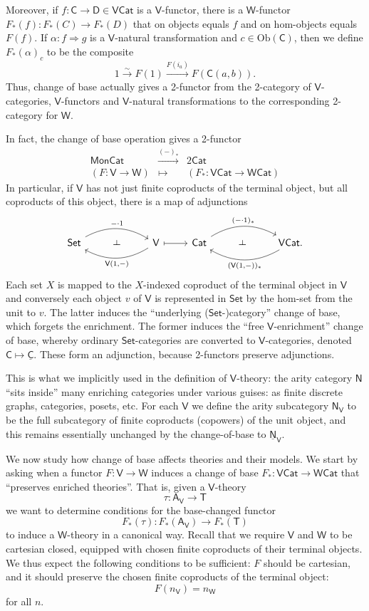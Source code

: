 \documentclass{amsart}
\theoremstyle{definition}
\def\ld{\rotatebox[origin=c]{-90}{$\dashv$}} %
\newcommand{\Set}{\mathsf{Set}}
\newcommand{\Cat}{\mathsf{Cat}}
\newcommand{\Mon}{\mathsf{Mon}}
\newcommand{\NN}{\mathsf{N}}
\newcommand{\A}{\mathsf{A}}
\newcommand{\V}{\mathsf{V}}
\newcommand{\W}{\mathsf{W}}
\newcommand{\D}{\mathsf{D}}
\newcommand{\C}{\mathsf{C}}
\newcommand{\T}{\mathsf{T}}
\newcommand{\Obj}{\mathrm{Ob}}
\newcommand{\maps}{\colon}
\begin{document}
Moreover, if $f\maps \C \to \D \in \V\Cat$ is a $\V$-functor, there is a $\W$-functor $F_*(f) \maps F_*(C) \to F_*(D)$ that on objects equals $f$ and on hom-objects equals $F(f)$. If $\alpha\maps f \Rightarrow g$ is a $\V$-natural transformation and $c\in \Obj(\C)$, then we define $F_*(\alpha)_c$ to be the composite
\[      1 \stackrel{\sim}{\longrightarrow} F(1) \stackrel{F(i_a)}{\longrightarrow}
F(\C(a,b)) .\]   
Thus, change of base actually gives a 2-functor from the 2-category of $\V$-categories, 
$\V$-functors and $\V$-natural transformations to the corresponding 2-category for $\W$.

In fact, the change of base operation gives a 2-functor
\[\begin{array}{ccc}
\Mon\Cat & \xrightarrow{(-)_*} & 2\Cat\\
(F\maps \V\to\W) & \mapsto & (F_*\maps \V\Cat\to\W\Cat)
\end{array}\]
In particular, if $\V$ has not just finite coproducts of the terminal object, but all 
coproducts of this object, there is a map of adjunctions
\[\begin{tikzcd}
	\Set \arrow[bend left,below]{rr}{-\cdot 1}
	& \ld &
	\arrow[bend left,above]{ll}{\V(1,-)} \V
	\arrow[maps to]{r}
	& \Cat \arrow[bend left,below]{rr}{(-\cdot 1)_*}
	& \ld &
	\arrow[bend left,above]{ll}{(\V(1,-))_*} \V\Cat.
\end{tikzcd}\]
Each set $X$ is mapped to the $X$-indexed coproduct of the terminal object in $\V$ and conversely each object $v$ of $\V$ is represented in $\Set$ by the hom-set from the unit to $v$. The latter induces the ``underlying ($\Set$-)category'' change of base, which forgets the enrichment. The former induces the ``free $\V$-enrichment'' change of base, whereby ordinary $\Set$-categories are converted to $\V$-categories, denoted $\C \mapsto \underline{\C}$. These form an adjunction, because 2-functors preserve adjunctions.

This is what we implicitly used in the definition of $\V$-theory: the arity category $\NN$ ``sits inside'' many enriching categories under various guises: as finite discrete graphs, categories, posets, etc. For each $\V$ we define the arity subcategory $\NN_\V$ to be the full subcategory of finite coproducts (copowers) of the unit object, and this remains essentially unchanged by the change-of-base to $\underline{\NN}_\V$.

We now study how change of base affects theories and their models.  We start by asking when a functor $F \maps \V \to \W$ induces a change of base $F_*\maps\V\Cat \to \W\Cat$ that ``preserves enriched theories''.   That is, given a $\V$-theory 
\[      \tau \maps  \A_\V \to \T \]
we want to determine conditions for the base-changed functor 
\[    F_*(\tau) \maps  F_*(\A_\V) \to  F_*(\T) \]
to induce a $\W$-theory in a canonical way.   Recall that we require $\V$ and $\W$ to be
cartesian closed, equipped with chosen finite coproducts of their terminal objects.   We thus expect the following conditions to be sufficient: $F$ should be cartesian, and it should
preserve the chosen finite coproducts of the terminal object:
\[      F(n_\V) = n_\W  \]
for all $n$.   
\end{document}
